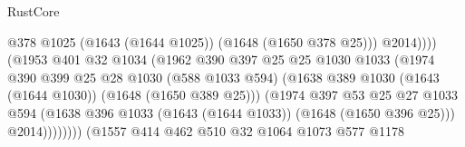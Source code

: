 \begin{lexlean}{RustCore}
\begin{coremodule}
                                                  @378
                                                  @1025
                                                  (@1643 (@1644 @1025))
                                                  (@1648 (@1650 @378 @25)))
                                                @2014))))
                                        (@1953
                                          @401
                                          @32
                                          @1034
                                          (@1962
                                            @390
                                            @397
                                            @25
                                            @25
                                            @1030
                                            @1033
                                            (@1974
                                              @390
                                              @399
                                              @25
                                              @28
                                              @1030
                                              (@588 @1033 @594)
                                              (@1638
                                                @389
                                                @1030
                                                (@1643 (@1644 @1030))
                                                (@1648 (@1650 @389 @25)))
                                              (@1974
                                                @397
                                                @53
                                                @25
                                                @27
                                                @1033
                                                @594
                                                (@1638
                                                  @396
                                                  @1033
                                                  (@1643 (@1644 @1033))
                                                  (@1648 (@1650 @396 @25)))
                                                @2014))))))))
                                (@1557
                                  @414
                                  @462
                                  @510
                                  @32
                                  @1064
                                  @1073
                                  @577
                                  @1178

\end{coremodule}
\end{lexlean}
